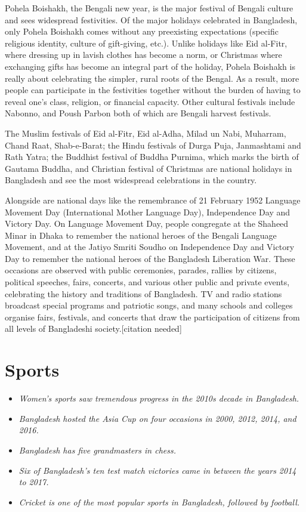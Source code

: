 Pohela Boishakh, the Bengali new year, is the major festival of Bengali
culture and sees widespread festivities. Of the major holidays
celebrated in Bangladesh, only Pohela Boishakh comes without any
preexisting expectations (specific religious identity, culture of
gift-giving, etc.). Unlike holidays like Eid al-Fitr, where dressing up
in lavish clothes has become a norm, or Christmas where exchanging gifts
has become an integral part of the holiday, Pohela Boishakh is really
about celebrating the simpler, rural roots of the Bengal. As a result,
more people can participate in the festivities together without the
burden of having to reveal one's class, religion, or financial capacity.
Other cultural festivals include Nabonno, and Poush Parbon both of which
are Bengali harvest festivals.

The Muslim festivals of Eid al-Fitr, Eid al-Adha, Milad un Nabi,
Muharram, Chand Raat, Shab-e-Barat; the Hindu festivals of Durga Puja,
Janmashtami and Rath Yatra; the Buddhist festival of Buddha Purnima,
which marks the birth of Gautama Buddha, and Christian festival of
Christmas are national holidays in Bangladesh and see the most
widespread celebrations in the country.

Alongside are national days like the remembrance of 21 February 1952
Language Movement Day (International Mother Language Day), Independence
Day and\\
Victory Day. On Language Movement Day, people congregate at the Shaheed
Minar in Dhaka to remember the national heroes of the Bengali Language
Movement, and at the Jatiyo Smriti Soudho on Independence Day and
Victory Day to remember the national heroes of the Bangladesh Liberation
War. These occasions are observed with public ceremonies, parades,
rallies by citizens, political speeches, fairs, concerts, and various
other public and private events, celebrating the history and traditions
of Bangladesh. TV and radio stations broadcast special programs and
patriotic songs, and many schools and colleges organise fairs,
festivals, and concerts that draw the participation of citizens from all
levels of Bangladeshi society.{[}citation needed{]}

\section{Sports}\label{sports}

\begin{itemize}
\item
  \emph{Women's sports saw tremendous progress in the 2010s decade in
  Bangladesh.}
\item
  \emph{Bangladesh hosted the Asia Cup on four occasions in 2000, 2012,
  2014, and 2016.}
\item
  \emph{Bangladesh has five grandmasters in chess.}
\item
  \emph{Six of Bangladesh's ten test match victories came in between the
  years 2014 to 2017.}
\item
  \emph{Cricket is one of the most popular sports in Bangladesh,
  followed by football.}
\end{itemize}

